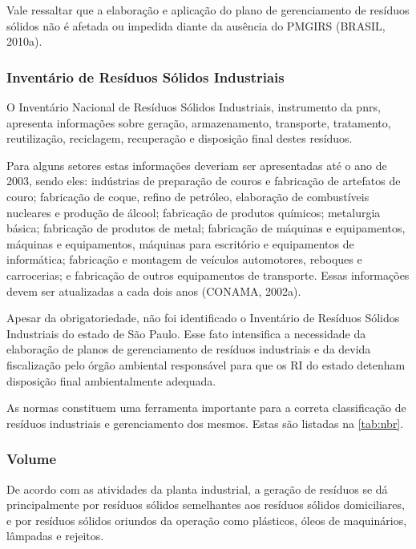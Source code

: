 	Vale ressaltar que a elaboração e aplicação do plano de gerenciamento de resíduos sólidos não é afetada ou impedida diante da ausência do PMGIRS (BRASIL, 2010a).

	\subsubsection{Inventário de Resíduos Sólidos Industriais}
	
	O Inventário Nacional de Resíduos Sólidos Industriais, instrumento da \gls{pnrs}, apresenta informações sobre geração, armazenamento, transporte, tratamento, reutilização, reciclagem, recuperação e disposição final destes resíduos. 
	
	Para alguns setores estas informações deveriam ser apresentadas até o ano de 2003, sendo eles: indústrias de preparação de couros e fabricação de artefatos de couro; fabricação de coque, refino de petróleo, elaboração de combustíveis nucleares e produção de álcool; fabricação de produtos químicos; metalurgia básica; fabricação de produtos de metal; fabricação de máquinas e equipamentos, máquinas e equipamentos, máquinas para escritório e equipamentos de informática; fabricação e montagem de veículos automotores, reboques e carrocerias; e fabricação de outros equipamentos de transporte. Essas informações devem ser atualizadas a cada dois anos (CONAMA, 2002a).
	
	Apesar da obrigatoriedade, não foi identificado o Inventário de Resíduos Sólidos Industriais do estado de São Paulo. Esse fato intensifica a necessidade da elaboração de planos de gerenciamento de resíduos industriais e da devida fiscalização pelo órgão ambiental responsável para que os RI do estado detenham disposição final ambientalmente adequada.
	
	As normas constituem uma ferramenta importante para a correta classificação de resíduos industriais e gerenciamento dos mesmos. Estas são listadas na \autoref{tab:nbr}.
	
	
	
	\subsubsection{Volume}
	De acordo com as atividades da planta industrial, a geração de resíduos se dá principalmente por resíduos sólidos semelhantes aos resíduos sólidos domiciliares, e por resíduos sólidos oriundos da operação como plásticos, óleos de maquinários, lâmpadas e rejeitos.
	
